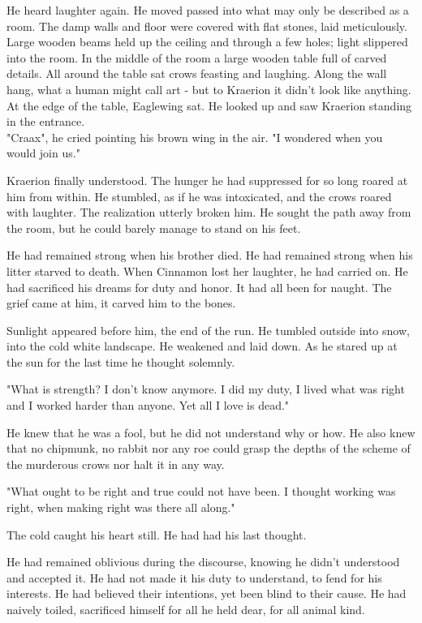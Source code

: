 \documentclass[smalldemyvopaper,11pt,twoside,onecolumn,openright,extrafontsizes]{memoir}
\begin{document}
He heard laughter again. He moved passed into what may only be described as a room. The damp walls and floor were covered with flat stones, laid meticulously. Large wooden beams held up the ceiling and through a few holes; light slippered into the room. In the middle of the room a large wooden table full of carved details. All around the table sat crows feasting and laughing. Along the wall hang, what a human might call art - but to Kraerion it didn't look like anything. At the edge of the table, Eaglewing sat. He looked up and saw Kraerion standing in the entrance.\\

"Craax", he cried pointing his brown wing in the air. "I wondered when you would join us."


Kraerion finally understood. The hunger he had suppressed for so long roared at him from within. He stumbled, as if he was intoxicated, and the crows roared with laughter. The realization utterly broken him. He sought the path away from the room, but he could barely manage to stand on his feet.

He had remained strong when his brother died. He had remained strong when his litter starved to death. When Cinnamon lost her laughter, he had carried on. He had sacrificed his dreams for duty and honor. It had all been for naught. The grief came at him, it carved him to the bones.

Sunlight appeared before him, the end of the run. He tumbled outside into snow, into the cold white landscape. He weakened and laid down. As he stared up at the sun for the last time he thought solemnly.

"What is strength? I don't know anymore. I did my duty, I lived what was right and I worked harder than anyone. Yet all I love is dead."

He knew that he was a fool, but he did not understand why or how. He also knew that no chipmunk, no rabbit nor any roe could grasp the depths of the scheme of the murderous crows nor halt it in any way.

"What ought to be right and true could not have been. I thought working was right, when making right was there all along."

The cold caught his heart still. He had had his last thought. 

He had remained oblivious during the discourse, knowing he didn't understood and accepted it. He had not made it his duty to understand, to fend for his interests. He had believed their intentions, yet been blind to their cause. He had naively toiled, sacrificed himself for all he held dear, for all animal kind.    
\end{document}
